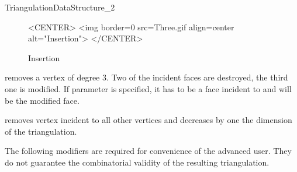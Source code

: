 \begin{ccRefConcept}{TriangulationDataStructure_2}
\begin{figure}
\begin{ccTexOnly}
\begin{center}  \end{center}
\caption{Insertion}
\end{ccTexOnly} 

\begin{ccHtmlOnly}
<CENTER>
<img border=0 src=Three.gif align=center alt="Insertion">
</CENTER>
\end{ccHtmlOnly} 
\end{figure}


{removes a vertex of degree 3. Two of the incident faces are destroyed,
the third one is modified.
If parameter   is specified, it has to be a face incident to 
and will be the modified face.
}



\ccGlue
{}
\ccGlue
{}
{removes vertex  incident to all other vertices
and  decreases by one the dimension of the triangulation.
 }


\begin{ccAdvanced}
The following modifiers are required for convenience of the advanced
user.
They do not guarantee the combinatorial validity 
of the resulting triangulation.


\end{ccAdvanced}
\end{ccRefConcept}

